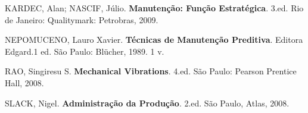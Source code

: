 \documentclass[
	12pt,				
	oneside,			
	a4paper,			
	english,			
	brazil				
	]{abntex2ppgsi}
\begin{document}
\postextual


%


\begin{thebibliography}{9}

  KARDEC, Alan; NASCIF, Júlio.
  \textbf{Manutenção: Função Estratégica}.
  3.ed. Rio de Janeiro: Qualitymark: Petrobras, 2009.

 NEPOMUCENO, Lauro Xavier.
  \textbf{Técnicas de Manutenção Preditiva}.
  Editora Edgard.1 ed. São Paulo: Blücher, 1989. 1 v.

 RAO, Singiresu S.
  \textbf{Mechanical Vibrations}.
  4.ed. São Paulo: Pearson Prentice Hall, 2008.
  
 SLACK, Nigel.
  \textbf{Administração da Produção}.
  2.ed. São Paulo, Atlas, 2008.
  

  

\end{thebibliography}


%
%






\begin{anexosenv}


\end{anexosenv}
\end{document}
